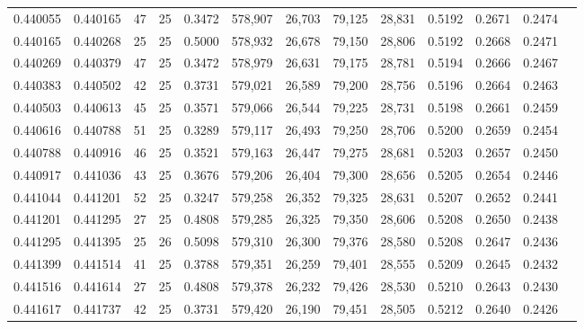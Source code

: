 \begin{tabular}{rrrrrrrrrrrrr}
0.440055 & 0.440165 &    47 &  25 &                                     0.3472 & 578,907 &  26,703 &  79,125 &  28,831 & 0.5192 & 0.2671 & 0.2474 \\
0.440165 & 0.440268 &    25 &  25 &                                     0.5000 & 578,932 &  26,678 &  79,150 &  28,806 & 0.5192 & 0.2668 & 0.2471 \\
0.440269 & 0.440379 &    47 &  25 &                                     0.3472 & 578,979 &  26,631 &  79,175 &  28,781 & 0.5194 & 0.2666 & 0.2467 \\
0.440383 & 0.440502 &    42 &  25 &                                     0.3731 & 579,021 &  26,589 &  79,200 &  28,756 & 0.5196 & 0.2664 & 0.2463 \\
0.440503 & 0.440613 &    45 &  25 &                                     0.3571 & 579,066 &  26,544 &  79,225 &  28,731 & 0.5198 & 0.2661 & 0.2459 \\
0.440616 & 0.440788 &    51 &  25 &                                     0.3289 & 579,117 &  26,493 &  79,250 &  28,706 & 0.5200 & 0.2659 & 0.2454 \\
0.440788 & 0.440916 &    46 &  25 &                                     0.3521 & 579,163 &  26,447 &  79,275 &  28,681 & 0.5203 & 0.2657 & 0.2450 \\
0.440917 & 0.441036 &    43 &  25 &                                     0.3676 & 579,206 &  26,404 &  79,300 &  28,656 & 0.5205 & 0.2654 & 0.2446 \\
0.441044 & 0.441201 &    52 &  25 &                                     0.3247 & 579,258 &  26,352 &  79,325 &  28,631 & 0.5207 & 0.2652 & 0.2441 \\
0.441201 & 0.441295 &    27 &  25 &                                     0.4808 & 579,285 &  26,325 &  79,350 &  28,606 & 0.5208 & 0.2650 & 0.2438 \\
0.441295 & 0.441395 &    25 &  26 &                                     0.5098 & 579,310 &  26,300 &  79,376 &  28,580 & 0.5208 & 0.2647 & 0.2436 \\
0.441399 & 0.441514 &    41 &  25 &                                     0.3788 & 579,351 &  26,259 &  79,401 &  28,555 & 0.5209 & 0.2645 & 0.2432 \\
0.441516 & 0.441614 &    27 &  25 &                                     0.4808 & 579,378 &  26,232 &  79,426 &  28,530 & 0.5210 & 0.2643 & 0.2430 \\
0.441617 & 0.441737 &    42 &  25 &                                     0.3731 & 579,420 &  26,190 &  79,451 &  28,505 & 0.5212 & 0.2640 & 0.2426 \\

\end{tabular}
